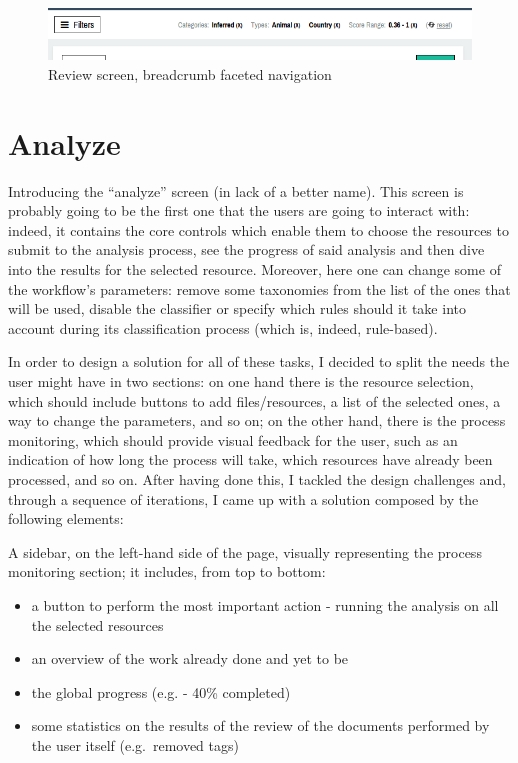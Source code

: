 \documentclass[12pt,oneside,svgnames]{memoir}
\begin{document}
\begin{figure}[htbp]
\centering
\includegraphics{./src/img/review-breadcrumb.png}
\caption{Review screen, breadcrumb faceted navigation}
\end{figure}

\section{Analyze}\label{analyze}

Introducing the ``analyze'' screen (in lack of a better name). This
screen is probably going to be the first one that the users are going to
interact with: indeed, it contains the core controls which enable them
to choose the resources to submit to the analysis process, see the
progress of said analysis and then dive into the results for the
selected resource. Moreover, here one can change some of the workflow's
parameters: remove some taxonomies from the list of the ones that will
be used, disable the classifier or specify which rules should it take
into account during its classification process (which is, indeed,
rule-based).

In order to design a solution for all of these tasks, I decided to split
the needs the user might have in two sections: on one hand there is the
resource selection, which should include buttons to add files/resources,
a list of the selected ones, a way to change the parameters, and so on;
on the other hand, there is the process monitoring, which should provide
visual feedback for the user, such as an indication of how long the
process will take, which resources have already been processed, and so
on. After having done this, I tackled the design challenges and, through
a sequence of iterations, I came up with a solution composed by the
following elements:

A sidebar, on the left-hand side of the page, visually representing the
process monitoring section; it includes, from top to bottom:

\begin{itemize}
\itemsep1pt\parskip0pt
\item
  a button to perform the most important action - running the analysis
  on all the selected resources
\item
  an overview of the work already done and yet to be
\item
  the global progress (e.g. - 40\% completed)
\item
  some statistics on the results of the review of the documents
  performed by the user itself (e.g.~removed tags)
\end{itemize}
\end{document}
